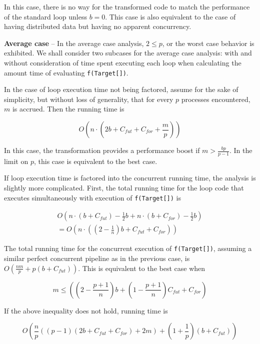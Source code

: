 In this case, there is no way for the transformed code
to match the performance of the standard loop unless $b = 0$. This
case is also equivalent to the case of having distributed data but
having no apparent concurrency.

{\bf Average case} -- In the average case analysis, $2 \leq p$, or the
worst case behavior is exhibited. We shall consider two subcases for
the average case analysis: with and without consideration of time
spent executing each loop when calculating the amount time of
evaluating {\tt f(Target[])}.

In the case of loop execution time not being factored, assume for the
sake of simplicity, but without loss of generality, that for every $p$
processes encountered, $m$ is accrued. Then the running time is 

\vspace{-.1in}
\[O(n \cdot (2b + C_{fut} + C_{for} + \frac{m}{p}))\]
\vspace{-.2in}

In this case, the transformation provides a performance boost if $m >
\frac{bp}{p-1}$. In the limit on $p$, this case is equivalent to the
best case.

If loop execution time is factored into the concurrent running time,
the analysis is slightly more complicated. First, the total running
time for the loop code that executes simultaneously with execution of
{\tt f(Target[])} is 

\[\begin{array}{l}
O(n \cdot (b + C_{fut}) - \frac{1}{2}b + n \cdot (b + C_{for}) -
\frac{1}{2}b) \\ 
= O(n \cdot ((2 - \frac{1}{n})b + C_{fut} + C_{for}))
\end{array}\]
\vspace{-.1in}

The total running time for the concurrent execution of {\tt f(Target[])},
assuming a similar perfect concurrent pipeline as in the previous
case, is $O(\frac{nm}{p} + p(b + C_{fut}))$. This is equivalent to the
best case when

\[m \leq ((2-\frac{p+1}{n})b + (1-\frac{p+1}{n})C_{fut}+C_{for})\]
\vspace{-.2in}

If the above inequality does not hold, running time is

\vspace{-.05in}
\[O(\frac{n}{p}((p-1)(2b+C_{fut}+C_{for})+2m)+(1+\frac{1}{p})(b+C_{fut}))\]
\vspace{-.1in}

